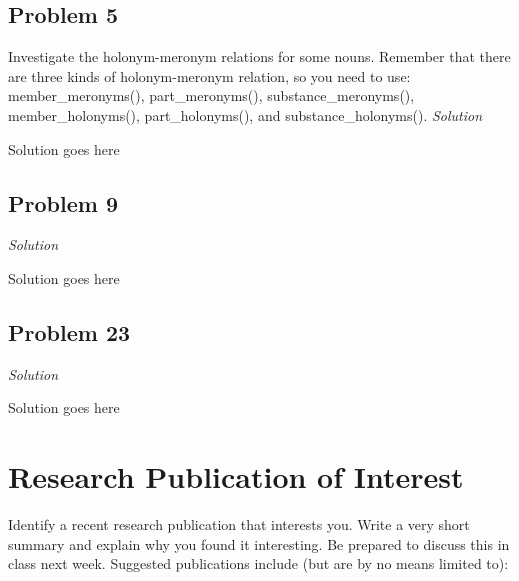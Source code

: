\documentclass[11pt]{article}
\newenvironment{solution}[1][]{
	\vspace{10px}\noindent\emph{Solution #1}
}{
	\vspace{10px}
}
\begin{document}
\subsection*{Problem 5}
Investigate the holonym-meronym relations for some nouns. Remember that there are three kinds of holonym-meronym relation, so you need to use: member\_meronyms(), part\_meronyms(),  substance\_meronyms(), member\_holonyms(), part\_holonyms(), and substance\_holonyms().
\begin{solution}
	Solution goes here
\end{solution}  


\subsection*{Problem 9}

\begin{solution}
	Solution goes here
\end{solution}  


\subsection*{Problem 23}

\begin{solution}
	Solution goes here
\end{solution}  


\section*{Research Publication of Interest} Identify a recent research publication that interests you. Write a very short summary and explain why you found it interesting. Be prepared to discuss this in class next week. Suggested publications include (but are by no means limited to): 

\vspace{11px}
\end{document}
